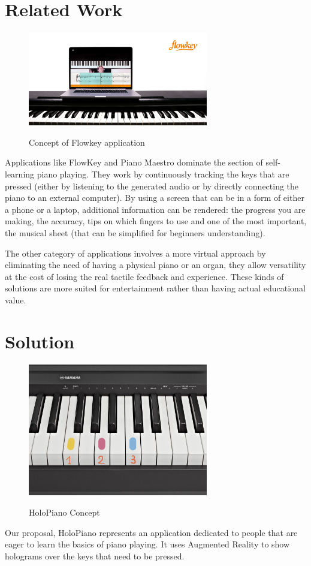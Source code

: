\documentclass[12 pct]{report}
\begin{document}
\section{Related Work}
\begin{figure}[H]
\includegraphics[width=0.7\textwidth]{flowkey}
\centering
\label{fig:hololens}
\caption{Concept of Flowkey application}
\end{figure}

Applications like FlowKey and Piano Maestro \cite{ng2015easy} dominate the section of self-learning piano playing. They work by continuously tracking the keys that are pressed (either by listening to the generated audio or by directly connecting the piano to an external computer). By using a screen that can be in a form of either a phone or a laptop, additional information can be rendered: the progress you are making, the accuracy, tips on which fingers to use and one of the most important, the musical sheet (that can be simplified for beginners understanding).


The other category of applications involves a more virtual approach by eliminating the need of having a physical piano or an organ, they allow versatility at the cost of losing the real tactile feedback and experience. These kinds of solutions are more suited for entertainment rather than having actual educational value.

\section{Solution}
\begin{figure}[H]
\includegraphics[width=0.7\textwidth]{piano}
\centering
\label{fig:feature-points}
\caption{HoloPiano Concept}
\end{figure}
Our proposal, HoloPiano represents an application dedicated to people that are eager to learn the basics of piano playing. It uses Augmented Reality to show holograms over the keys that need to be pressed.
\end{document}
